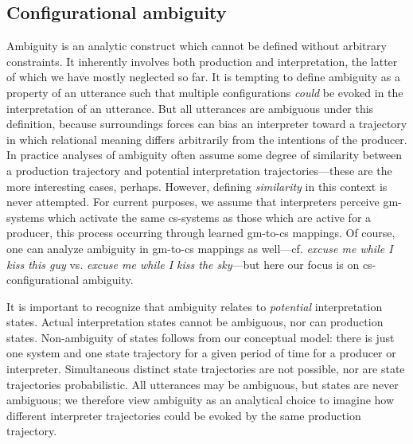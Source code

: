 \subsection{Configurational ambiguity}

Ambiguity is an analytic construct which cannot be defined without arbitrary constraints. It inherently  involves both production and interpretation, the latter of which we have mostly neglected so far. It is tempting to define ambiguity as a property of an utterance such that multiple configurations \textit{could} be evoked in the interpretation of an utterance. But all utterances are ambiguous under this definition, because surroundings forces can bias an interpreter toward a trajectory in which relational meaning differs arbitrarily from the intentions of the producer. In practice analyses of ambiguity often assume some degree of similarity between a production trajectory and potential interpretation trajectories—these are the more interesting cases, perhaps. However, defining \textit{similarity} in this context is never attempted. For current purposes, we assume that interpreters perceive gm-systems which activate the same cs-systems as those which are active for a producer, this process occurring through learned gm-to-cs mappings. Of course, one can analyze ambiguity in gm-to-cs mappings as well—cf. \textit{excuse me while I kiss this guy} vs. \textit{excuse me while I kiss the sky}—but here our focus is on cs-configurational ambiguity. 

  It is important to recognize that ambiguity relates to \textit{potential} interpretation states. Actual interpretation states cannot be ambiguous, nor can production states. Non-ambiguity of states follows from our conceptual model: there is just one system and one state trajectory for a given period of time for a producer or interpreter. Simultaneous distinct state trajectories are not possible, nor are state trajectories probabilistic. All utterances may be ambiguous, but states are never ambiguous; we therefore view ambiguity as an analytical choice to imagine how different interpreter trajectories could be evoked by the same production trajectory.

